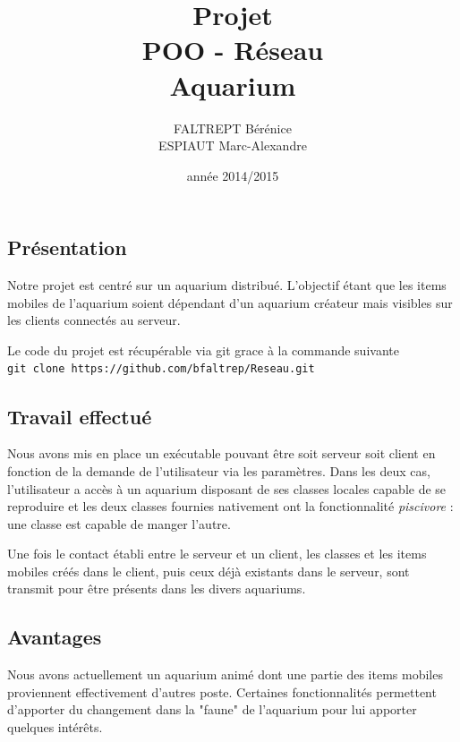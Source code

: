 \documentclass[a4paper, 12pt]{report}
\title{Projet \\POO - Réseau \\ Aquarium}
\author {FALTREPT Bérénice \\ ESPIAUT Marc-Alexandre}
\date{année 2014/2015}
\begin{document}
	\begin{spacing}{1.3}
\maketitle%
\tableofcontents
\newpage
\textcolor{colortitre1}{\section*{Présentation}}

Notre projet est centré sur un aquarium distribué. L'objectif étant que les items mobiles de l'aquarium soient dépendant d'un aquarium créateur mais visibles sur les clients connectés au serveur.

Le code du projet est récupérable via git grace à la commande suivante\\
\texttt{git clone https://github.com/bfaltrep/Reseau.git}

\textcolor{colortitre1}{\subsection*{Travail effectué}}
	
Nous avons mis en place un exécutable pouvant être soit serveur soit client en fonction de la demande de l'utilisateur via les paramètres. Dans les deux cas, l'utilisateur a accès à un aquarium disposant de ses classes locales capable de se reproduire et les deux classes fournies nativement ont la fonctionnalité \textit{piscivore} : une classe est capable de manger l'autre.
	
Une fois le contact établi entre le serveur et un client, les classes et les items mobiles créés dans le client, puis ceux déjà existants dans le serveur, sont transmit pour être présents dans les divers aquariums.
	
\textcolor{colortitre2}{\subsection*{Avantages}}

Nous avons actuellement un aquarium animé dont une partie des items mobiles proviennent effectivement d'autres poste. Certaines fonctionnalités permettent d'apporter du changement dans la "faune" de l'aquarium pour lui apporter quelques intérêts.
	

\end{spacing}
\end{document}
